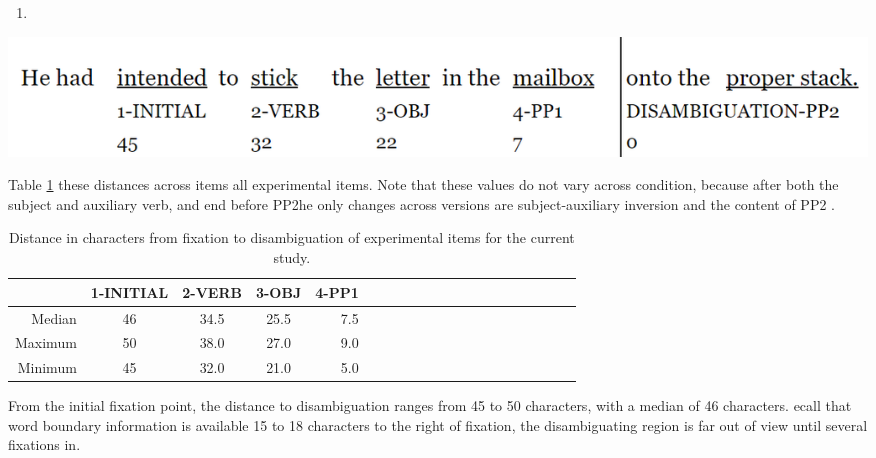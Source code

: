 \documentclass[12pt,oneside]{book}
\begin{document}
\begin{enumerate}
\def\labelenumi{(\arabic{enumi})}
\setcounter{enumi}{45}
\item
\end{enumerate}

\includegraphics{distance-to-cr.png}

Table \ref{tab:dtcs}  these distances  across items all experimental items. Note that these values do not vary across condition, because  after both the subject and auxiliary verb, and  end before PP2he only changes across versions are subject-auxiliary inversion and the content of PP2 .

\begin{table}[!h]

\caption{\label{tab:dtcs}Distance in characters from fixation to disambiguation of experimental items for the current study.}
\centering
\begin{tabular}{rcccrcccrcccrcccrccc}
\toprule
  & 1-INITIAL & 2-VERB & 3-OBJ & 4-PP1\\
\midrule
Median & 46 & 34.5 & 25.5 & 7.5\\
Maximum & 50 & 38.0 & 27.0 & 9.0\\
Minimum & 45 & 32.0 & 21.0 & 5.0\\
\bottomrule
\end{tabular}
\end{table}

From the initial fixation point, the distance to disambiguation ranges from 45 to 50 characters, with a median of 46 characters. ecall that word boundary information is available  15 to 18 characters to the right of fixation,  the disambiguating region is far out of view until several fixations in.
\end{document}

